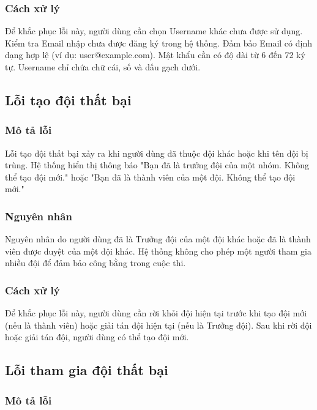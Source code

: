 \subsubsection{Cách xử lý}

Để khắc phục lỗi này, người dùng cần chọn Username khác chưa được sử dụng. Kiểm tra Email nhập chưa được đăng ký trong hệ thống. Đảm bảo Email có định dạng hợp lệ (ví dụ: user@example.com). Mật khẩu cần có độ dài từ 6 đến 72 ký tự. Username chỉ chứa chữ cái, số và dấu gạch dưới.

\subsection{Lỗi tạo đội thất bại}

\subsubsection{Mô tả lỗi}

Lỗi tạo đội thất bại xảy ra khi người dùng đã thuộc đội khác hoặc khi tên đội bị trùng. Hệ thống hiển thị thông báo "Bạn đã là trưởng đội của một nhóm. Không thể tạo đội mới." hoặc "Bạn đã là thành viên của một đội. Không thể tạo đội mới."

\subsubsection{Nguyên nhân}

Nguyên nhân do người dùng đã là Trưởng đội của một đội khác hoặc đã là thành viên được duyệt của một đội khác. Hệ thống không cho phép một người tham gia nhiều đội để đảm bảo công bằng trong cuộc thi.

\subsubsection{Cách xử lý}

Để khắc phục lỗi này, người dùng cần rời khỏi đội hiện tại trước khi tạo đội mới (nếu là thành viên) hoặc giải tán đội hiện tại (nếu là Trưởng đội). Sau khi rời đội hoặc giải tán đội, người dùng có thể tạo đội mới.

\subsection{Lỗi tham gia đội thất bại}

\subsubsection{Mô tả lỗi}

